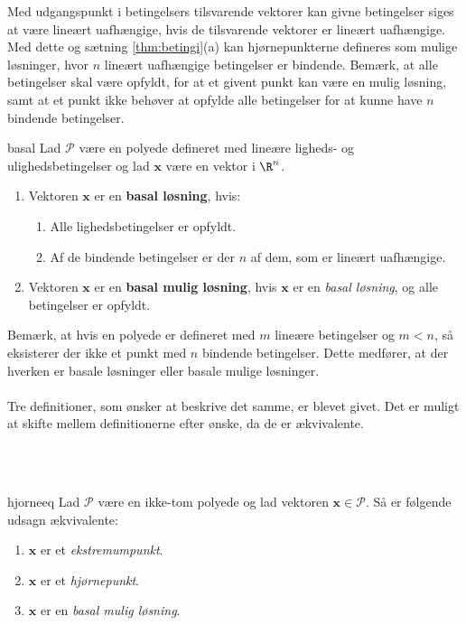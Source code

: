 %
Med udgangspunkt i betingelsers tilsvarende vektorer kan givne betingelser siges at være lineært uafhængige, hvis de tilsvarende vektorer er lineært uafhængige.
Med dette og sætning \ref{thm:betingi}(a) kan hjørnepunkterne defineres som mulige løsninger, hvor $n$ lineært uafhængige betingelser er bindende.
Bemærk, at alle betingelser skal være opfyldt, for at et givent punkt kan være en mulig løsning, samt at et punkt ikke behøver at opfylde alle betingelser for at kunne have $n$ bindende betingelser.
%
\begin{defn}{}{basal}
Lad $\mathcal{P}$ være en polyede defineret med lineære ligheds- og ulighedsbetingelser og lad $\textbf{x}$ være en vektor i $\R^n$.
%
\begin{enumerate}[label=(\alph*)]
\item Vektoren $\textbf{x}$ er en \textbf{basal løsning}, hvis:
%
\begin{enumerate}[label=(\roman*)]
\item Alle lighedsbetingelser er opfyldt.
\item Af de bindende betingelser er der $n$ af dem, som er lineært uafhængige.
\end{enumerate}
%
\item Vektoren $\textbf{x}$ er en \textbf{basal mulig løsning}, hvis $\textbf{x}$ er en \textit{basal løsning}, og alle betingelser er opfyldt.
\end{enumerate}
\end{defn}\noindent
%
Bemærk, at hvis en polyede er defineret med $m$ lineære betingelser og $m<n$, så eksisterer der ikke et punkt med $n$ bindende betingelser.
Dette medfører, at der hverken er basale løsninger eller basale mulige løsninger.\\\\
%
Tre definitioner, som ønsker at beskrive det samme, er blevet givet.
Det er muligt at skifte mellem definitionerne efter ønske, da de er ækvivalente.
%
%

\\\\
%
%
\begin{thm}{}{hjorneeq}
Lad $\mathcal{P}$ være en ikke-tom polyede og lad vektoren $\textbf{x}\in \mathcal{P}$.
Så er følgende udsagn ækvivalente:
%
\begin{enumerate}[label=(\alph*)]
\item $\textbf{x}$ er et \textit{ekstremumpunkt}.
\item $\textbf{x}$ er et \textit{hjørnepunkt}.
\item $\textbf{x}$ er en \textit{basal mulig løsning}.
\end{enumerate}
%
\end{thm}
